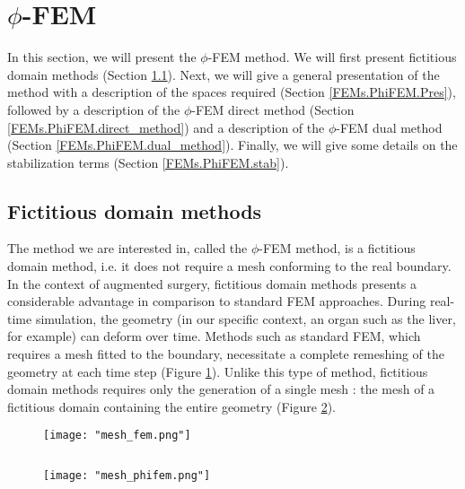 \section{$\phi$-FEM} \label{FEMs.PhiFEM}

In this section, we will present the $\phi$-FEM method. We will first present fictitious domain methods (Section \ref{FEMs.PhiFEM.pinciple}). Next, we will give a general presentation of the method with a description of the spaces required (Section \ref{FEMs.PhiFEM.Pres}), followed by a description of the $\phi$-FEM direct method (Section \ref{FEMs.PhiFEM.direct_method}) and a description of the $\phi$-FEM dual method (Section \ref{FEMs.PhiFEM.dual_method}). Finally, we will give some details on the stabilization terms 
(Section \ref{FEMs.PhiFEM.stab}).

\subsection{Fictitious domain methods} \label{FEMs.PhiFEM.pinciple}

The method we are interested in, called the $\phi$-FEM method, is a fictitious domain method, i.e. it does not require a mesh conforming to the real boundary. In the context of augmented surgery, fictitious domain methods presents a considerable advantage in comparison to standard FEM approaches. During real-time simulation, the geometry (in our specific context, an organ such as the liver, for example) can deform over time. Methods such as standard FEM, which requires a mesh fitted to the boundary, necessitate a complete remeshing of the geometry at each time step (Figure \ref{mesh_fem}). Unlike this type of method, fictitious domain methods requires only the generation of a single mesh : the mesh of a fictitious domain containing the entire geometry (Figure \ref{mesh_phifem}). 

\begin{minipage}{0.52\linewidth}
	\begin{figure}[H]
		\centering
		\texttt{[image: "mesh\_fem.png"]}
		\label{mesh_fem}
	\end{figure}
\end{minipage} $\qquad$
\begin{minipage}{0.44\linewidth}
	\begin{figure}[H]
		\centering
		\texttt{[image: "mesh\_phifem.png"]}
		\label{mesh_phifem}
	\end{figure}
\end{minipage}

